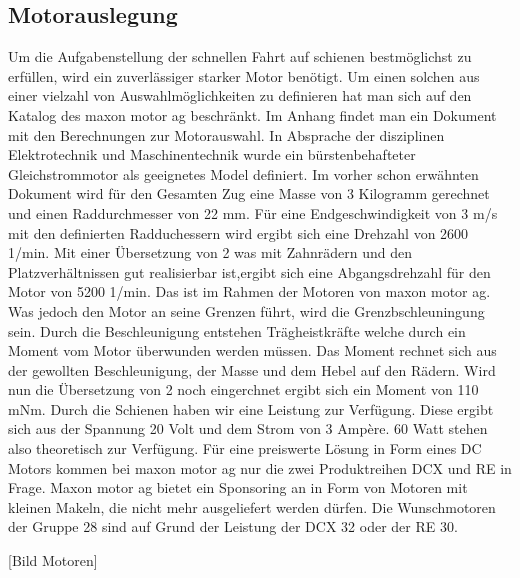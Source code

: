 \documentclass[../../main.tex]{subfiles}
\begin{document}
    \subsection{Motorauslegung}
    Um die Aufgabenstellung der schnellen Fahrt auf schienen bestmöglichst zu erfüllen, wird ein zuverlässiger starker Motor benötigt. Um einen solchen aus einer vielzahl von Auswahlmöglichkeiten zu definieren hat man sich auf den Katalog des maxon motor ag beschränkt. Im Anhang findet man ein Dokument mit den Berechnungen zur Motorauswahl. In Absprache der disziplinen Elektrotechnik und Maschinentechnik wurde ein  bürstenbehafteter Gleichstrommotor als geeignetes Model definiert. Im vorher schon erwähnten Dokument wird für den Gesamten Zug eine Masse von 3 Kilogramm gerechnet und einen Raddurchmesser von 22 mm. Für eine Endgeschwindigkeit von 3 m/s mit den definierten Radduchessern wird ergibt sich eine Drehzahl von 2600 1/min. Mit einer Übersetzung von 2 was mit Zahnrädern und den Platzverhältnissen gut realisierbar ist,ergibt sich eine Abgangsdrehzahl für den Motor von 5200 1/min. Das ist im Rahmen der Motoren von maxon motor ag. Was jedoch den Motor an seine Grenzen führt, wird die Grenzbschleuningung sein. Durch die Beschleunigung entstehen Trägheistkräfte welche durch ein Moment vom Motor überwunden werden müssen. Das Moment rechnet sich aus der gewollten Beschleunigung, der Masse und dem Hebel auf den Rädern. Wird nun die Übersetzung von 2 noch eingerchnet ergibt sich ein Moment von 110 mNm. Durch die Schienen haben wir eine Leistung zur Verfügung. Diese ergibt sich aus der Spannung 20 Volt und dem Strom von 3 Ampère. 60 Watt stehen also theoretisch zur Verfügung. Für eine preiswerte Lösung in Form eines DC Motors kommen bei maxon motor ag nur die zwei Produktreihen DCX und RE in Frage. Maxon motor ag bietet ein Sponsoring an in Form von Motoren mit kleinen Makeln, die nicht mehr ausgeliefert werden dürfen. Die Wunschmotoren der Gruppe 28 sind auf Grund der Leistung der DCX 32 oder der RE 30.

    [Bild Motoren]

    
\end{document}
